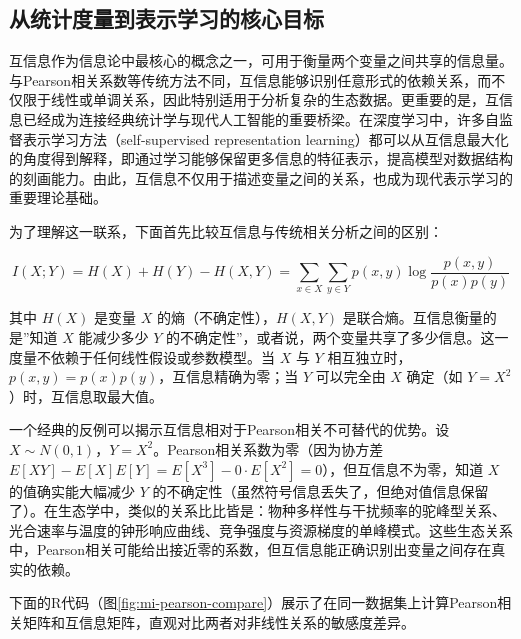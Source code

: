 \documentclass[
  twoside,12pt,fontset=none]{ctexbook}
\begin{document}
\hypertarget{ux4eceux7edfux8ba1ux5ea6ux91cfux5230ux8868ux793aux5b66ux4e60ux7684ux6838ux5fc3ux76eeux6807}{%
\subsection{从统计度量到表示学习的核心目标}\label{ux4eceux7edfux8ba1ux5ea6ux91cfux5230ux8868ux793aux5b66ux4e60ux7684ux6838ux5fc3ux76eeux6807}}

互信息作为信息论中最核心的概念之一，可用于衡量两个变量之间共享的信息量。与Pearson相关系数等传统方法不同，互信息能够识别任意形式的依赖关系，而不仅限于线性或单调关系，因此特别适用于分析复杂的生态数据。更重要的是，互信息已经成为连接经典统计学与现代人工智能的重要桥梁。在深度学习中，许多自监督表示学习方法（self-supervised representation learning）都可以从互信息最大化的角度得到解释，即通过学习能够保留更多信息的特征表示，提高模型对数据结构的刻画能力。由此，互信息不仅用于描述变量之间的关系，也成为现代表示学习的重要理论基础。

为了理解这一联系，下面首先比较互信息与传统相关分析之间的区别：

\[I(X; Y) = H(X) + H(Y) - H(X, Y) = \sum_{x \in X} \sum_{y \in Y} p(x, y) \log \frac{p(x, y)}{p(x)p(y)}\]

其中 \(H(X)\) 是变量 \(X\) 的熵（不确定性），\(H(X,Y)\) 是联合熵。互信息衡量的是''知道 \(X\) 能减少多少 \(Y\) 的不确定性''，或者说，两个变量共享了多少信息。这一度量不依赖于任何线性假设或参数模型。当 \(X\) 与 \(Y\) 相互独立时，\(p(x,y) = p(x)p(y)\)，互信息精确为零；当 \(Y\) 可以完全由 \(X\) 确定（如 \(Y = X^2\)）时，互信息取最大值。

一个经典的反例可以揭示互信息相对于Pearson相关不可替代的优势。设 \(X \sim N(0, 1)\)，\(Y = X^2\)。Pearson相关系数为零（因为协方差 \(E[XY] - E[X]E[Y] = E[X^3] - 0 \cdot E[X^2] = 0\)），但互信息不为零，知道 \(X\) 的值确实能大幅减少 \(Y\) 的不确定性（虽然符号信息丢失了，但绝对值信息保留了）。在生态学中，类似的关系比比皆是：物种多样性与干扰频率的驼峰型关系、光合速率与温度的钟形响应曲线、竞争强度与资源梯度的单峰模式。这些生态关系中，Pearson相关可能给出接近零的系数，但互信息能正确识别出变量之间存在真实的依赖。

下面的R代码（图\ref{fig:mi-pearson-compare}）展示了在同一数据集上计算Pearson相关矩阵和互信息矩阵，直观对比两者对非线性关系的敏感度差异。
\end{document}
